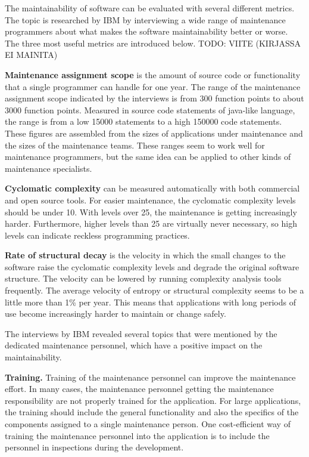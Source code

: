 The maintainability of software can be evaluated with several different metrics. The topic is researched by IBM by interviewing a wide range of maintenance programmers about what makes the software maintainability better or worse. The three most useful metrics are introduced below. TODO: VIITE (KIRJASSA EI MAINITA)

\textbf{Maintenance assignment scope} is the amount of source code or functionality that a single programmer can handle for one year. The range of the maintenance assignment scope indicated by the interviews is from 300 function points to about 3000 function points. Measured in source code statements of java-like language, the range is from a low 15000 statements to a high 150000 code statements. These figures are assembled from the sizes of applications under maintenance and the sizes of the maintenance teams. These ranges seem to work well for maintenance programmers, but the same idea can be applied to other kinds of maintenance specialists.

\textbf{Cyclomatic complexity} can be measured automatically with both commercial and open source tools. For easier maintenance, the cyclomatic complexity levels should be under 10. With levels over 25, the maintenance is getting increasingly harder. Furthermore, higher levels than 25 are virtually never necessary, so high levels can indicate reckless programming practices.

\textbf{Rate of structural decay} is the velocity in which the small changes to the software raise the cyclomatic complexity levels and degrade the original software structure. The velocity can be lowered by running complexity analysis tools frequently. The average velocity of entropy or structural complexity seems to be a little more than 1\% per year. This means that applications with long periods of use become increasingly harder to maintain or change safely.

The interviews by IBM revealed several topics that were mentioned by the dedicated maintenance personnel, which have a positive impact on the maintainability.

\textbf{Training.} Training of the maintenance personnel can improve the maintenance effort. In many cases, the maintenance personnel getting the maintenance responsibility are not properly trained for the application. For large applications, the training should include the general functionality and also the specifics of the components assigned to a single maintenance person. One cost-efficient way of training the maintenance personnel into the application is to include the personnel in inspections during the development.

